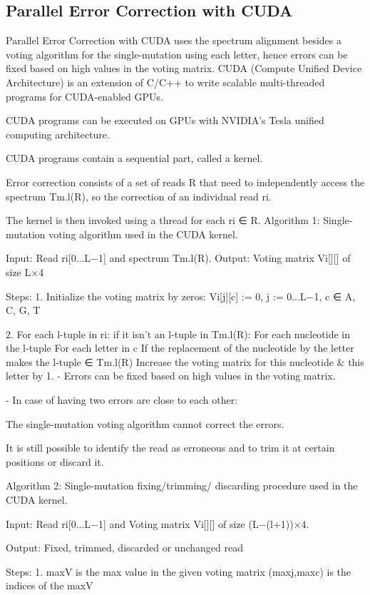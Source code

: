 \documentclass{llncs}
\begin{document}
\subsection{Parallel Error Correction with CUDA}
Parallel Error Correction with CUDA \cite{Cuda} uses the spectrum alignment besides a voting algorithm for the single-mutation using each letter, hence errors can be fixed based on high values in the voting matrix.
CUDA (Compute Unified Device Architecture) is an extension of C/C++ to write scalable multi-threaded programs for CUDA-enabled GPUs.

CUDA programs can be executed on GPUs with NVIDIA’s Tesla unified computing architecture.

CUDA programs contain a sequential part, called a kernel.

Error correction consists of a set of reads R that need to independently access the spectrum Tm.l(R), so the correction of an individual read ri.

The kernel is then invoked using a thread for each ri ∈ R.
Algorithm 1: Single-mutation voting algorithm used in the CUDA kernel.

Input: Read ri[0...L−1] and spectrum Tm.l(R).
Output: Voting matrix Vi[][] of size L×4

Steps: 
  1. Initialize the voting matrix by zeros: Vi[j][c] := 0, j := 0...L−1, c ∈ {A, C, G, T}
  
  2. For each l-tuple in ri:
        if it isn't an l-tuple in Tm.l(R):
	   For each nucleotide in the l-tuple 
	     For each letter in c
		If the replacement of the nucleotide by the letter makes the l-tuple ∈ Tm.l(R)
                     Increase the voting matrix for this nucleotide \& this letter by 1.
 - Errors can be fixed based on high values in the voting matrix. 


- In case of having two errors are close to each other:

     The single-mutation voting algorithm cannot correct the errors. 

      It is still possible to identify the read as erroneous and to trim it at certain 
      positions or discard it. 
      
  Algorithm 2: Single-mutation fixing/trimming/ discarding procedure used in the CUDA kernel.


Input: Read ri[0...L−1] and Voting matrix Vi[][] of size (L−(l+1))×4.

Output: Fixed, trimmed, discarded or unchanged read

Steps:
  1. maxV is the max value in the given voting matrix
     (maxj,maxc) is the indices of the maxV
\end{document}
